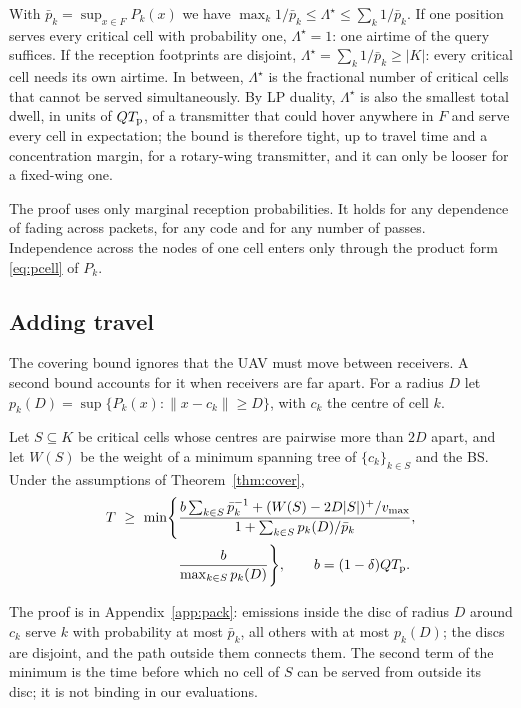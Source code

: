 \begin{remark}
With $\bar p_k=\sup_{x\in F}P_k(x)$ we have $\max_k1/\bar p_k\le\Lambda^\star\le\sum_k1/\bar p_k$. If one position serves
every critical cell with probability one, $\Lambda^\star=1$: one airtime of the query suffices. If the reception
footprints are disjoint, $\Lambda^\star=\sum_k1/\bar p_k\ge|K|$: every critical cell needs its own airtime. In between,
$\Lambda^\star$ is the fractional number of critical cells that cannot be served simultaneously. By LP duality,
$\Lambda^\star$ is also the smallest total dwell, in units of $QT_{\mathrm p}$, of a transmitter that could hover anywhere in $F$
and serve every cell in expectation; the bound is therefore tight, up to travel time and a concentration margin, for a
rotary-wing transmitter, and it can only be looser for a fixed-wing one.
\end{remark}
\begin{remark}[Robustness]
The proof uses only marginal reception probabilities. It holds for any dependence of fading across packets, for any code
and for any number of passes. Independence across the nodes of one cell enters only through the product form
\eqref{eq:pcell} of $P_k$.
\end{remark}

\subsection{Adding travel}
The covering bound ignores that the UAV must move between receivers. A second bound accounts for it when receivers are
far apart. For a radius $D$ let $p_k(D)=\sup\{P_k(x):\lVert x-c_k\rVert\ge D\}$, with $c_k$ the centre of cell $k$.
\begin{proposition}\label{prop:pack}
Let $S\subseteq K$ be critical cells whose centres are pairwise more than $2D$ apart, and let $W(S)$ be the weight of a
minimum spanning tree of $\{c_k\}_{k\in S}$ and the BS. Under the assumptions of Theorem~\ref{thm:cover},
\begin{equation}
\begin{aligned}
T\ \ge\ \min\Biggl\{&\frac{b\sum_{k\in S}\bar p_k^{-1}+(W(S)-2D|S|)^+/v_{\max}}{1+\sum_{k\in S}p_k(D)/\bar p_k},\\
&\frac{b}{\max_{k\in S}p_k(D)}\Biggr\},\qquad b=(1-\delta)QT_{\mathrm p} .
\end{aligned}\label{eq:pack}
\end{equation}
\end{proposition}
The proof is in Appendix~\ref{app:pack}: emissions inside the disc of radius $D$ around $c_k$ serve $k$ with probability
at most $\bar p_k$, all others with at most $p_k(D)$; the discs are disjoint, and the path outside them connects them.
The second term of the minimum is the time before which no cell of $S$ can be served from outside its disc; it is not
binding in our evaluations.

